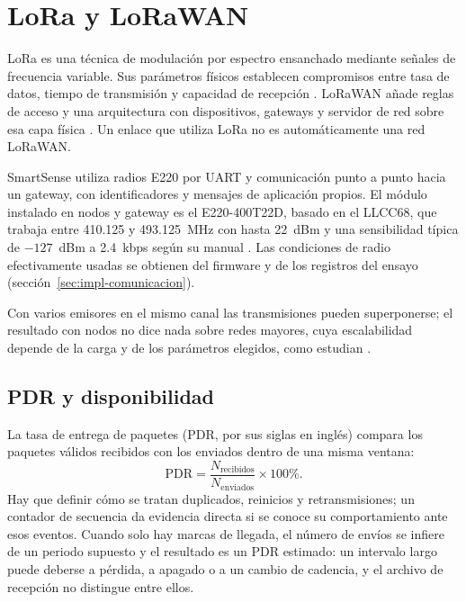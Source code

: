 \section{LoRa y LoRaWAN}
\label{sec:marco-lora}
LoRa es una técnica de modulación por espectro ensanchado mediante señales de frecuencia variable. Sus parámetros físicos establecen compromisos entre tasa de datos, tiempo de transmisión y capacidad de recepción \citep{semtech2015}. LoRaWAN añade reglas de acceso y una arquitectura con dispositivos, gateways y servidor de red sobre esa capa física \citep{augustin2016}. Un enlace que utiliza LoRa no es automáticamente una red LoRaWAN.

SmartSense utiliza radios E220 por UART y comunicación punto a punto hacia un gateway, con identificadores y mensajes de aplicación propios. El módulo instalado en nodos y gateway es el E220-400T22D, basado en el LLCC68, que trabaja entre 410.125 y 493.125~MHz con hasta 22~dBm y una sensibilidad típica de $-127$~dBm a 2.4~kbps según su manual \citep{e220manual}. Las condiciones de radio efectivamente usadas se obtienen del firmware y de los registros del ensayo (sección~\ref{sec:impl-comunicacion}).

Con varios emisores en el mismo canal las transmisiones pueden superponerse; el resultado con \NumeroNodos{} nodos no dice nada sobre redes mayores, cuya escalabilidad depende de la carga y de los parámetros elegidos, como estudian \citet{bor2016}.

\subsection{PDR y disponibilidad}
\label{sec:marco-pdr-disponibilidad}
La tasa de entrega de paquetes (PDR, por sus siglas en inglés) compara los paquetes válidos recibidos con los enviados dentro de una misma ventana:
\begin{equation}
\mathrm{PDR}=\frac{N_{\mathrm{recibidos}}}{N_{\mathrm{enviados}}}\times100\text{\%}.
\label{eq:marco-pdr}
\end{equation}
Hay que definir cómo se tratan duplicados, reinicios y retransmisiones; un contador de secuencia da evidencia directa si se conoce su comportamiento ante esos eventos. Cuando solo hay marcas de llegada, el número de envíos se infiere de un periodo supuesto y el resultado es un PDR estimado: un intervalo largo puede deberse a pérdida, a apagado o a un cambio de cadencia, y el archivo de recepción no distingue entre ellos.

